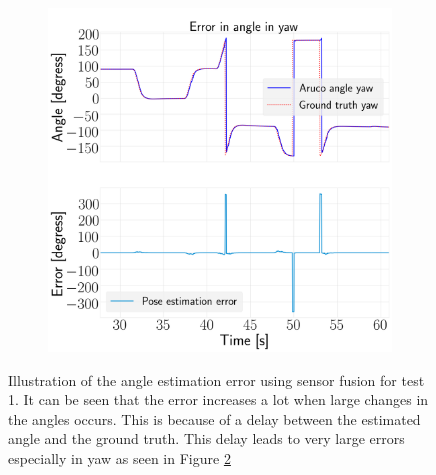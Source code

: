 \documentclass[../Head/report.tex]{subfiles}
\begin{document}
\begin{figure}[H]
\begin{subfigure}[t]{.30\textwidth}
        \caption{}
        \label{fig:vision_navigation_error_pitch}
    \end{subfigure}
     \hspace{0.2em}
    \begin{subfigure}[t]{.30\textwidth}
        \centering
        \includegraphics[width=\textwidth]{../Figures/vision_navigation/pose_error_yaw_test2.png}
        \caption{}
        \label{fig:vision_navigation_error_yaw}
    \end{subfigure}
    \caption{Illustration of the angle estimation error using sensor fusion for test 1. It can be seen that the error increases a lot when large changes in the angles occurs. This is because of a delay between the estimated angle and the ground truth. This delay leads to very large errors especially in yaw as seen in Figure \ref{fig:vision_navigation_error_yaw}}
    \label{fig:vision_navigation_error_angle}
\end{figure}
\end{document}
